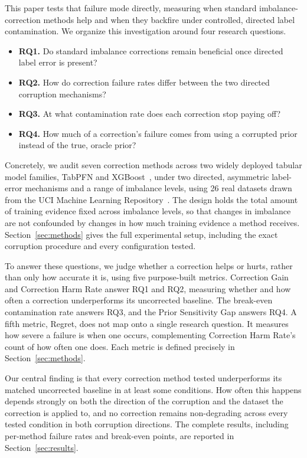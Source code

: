 This paper tests that failure mode directly, measuring when standard
imbalance-correction methods help and when they backfire under controlled, directed
label contamination. We organize this investigation around four research
questions.

\begin{itemize}
\item \textbf{RQ1.} Do standard imbalance corrections remain beneficial once
directed label error is present?
\item \textbf{RQ2.} How do correction failure rates differ between the two
directed corruption mechanisms?
\item \textbf{RQ3.} At what contamination rate does each correction stop paying off?
\item \textbf{RQ4.} How much of a correction's failure comes from using a
corrupted prior instead of the true, oracle prior?
\end{itemize}

Concretely, we audit seven correction methods across two widely deployed tabular
model families, TabPFN and XGBoost~\cite{chen2016xgboost}, under two directed,
asymmetric label-error mechanisms and a range of imbalance levels, using 26 real
datasets drawn from the UCI Machine Learning Repository~\cite{kelly_uci}. The design
holds the total amount of training evidence fixed across imbalance levels, so that
changes in imbalance are not confounded by changes in how much training evidence a
method receives. Section~\ref{sec:methods} gives the full experimental setup, including
the exact corruption procedure and every configuration tested.

To answer these questions, we judge whether a correction helps or hurts, rather
than only how accurate it is, using five purpose-built metrics. Correction Gain and
Correction Harm Rate answer RQ1 and RQ2, measuring whether and how often a
correction underperforms its uncorrected baseline. The break-even contamination
rate answers RQ3, and the Prior Sensitivity Gap answers RQ4. A fifth metric,
Regret, does not map onto a single research question. It measures how severe a
failure is when one occurs, complementing Correction Harm Rate's count of how
often one does. Each metric is defined precisely in Section~\ref{sec:methods}.

Our central finding is that every correction method tested underperforms its
matched uncorrected baseline in at least some conditions. How often this happens
depends strongly on both the direction of the corruption and the dataset the
correction is applied to, and no correction remains non-degrading across every
tested condition in both corruption directions. The complete results, including
per-method failure rates and break-even points, are reported in
Section~\ref{sec:results}.

